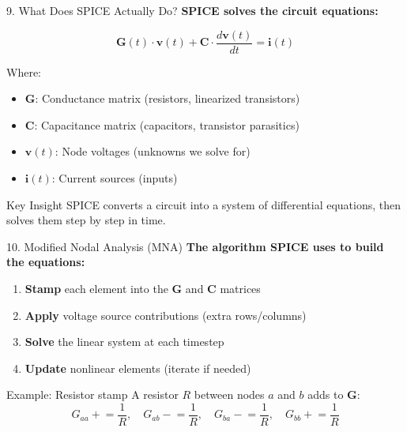 \documentclass[aspectratio=169, 11pt]{beamer}
\begin{document}
\begin{frame}{9. What Does SPICE Actually Do?}
    \textbf{SPICE solves the circuit equations:}

    \vspace{0.5em}
    \[ \mathbf{G}(t) \cdot \mathbf{v}(t) + \mathbf{C} \cdot \frac{d\mathbf{v}(t)}{dt} = \mathbf{i}(t) \]

    Where:
    \begin{itemize}
        \item $\mathbf{G}$: Conductance matrix (resistors, linearized transistors)
        \item $\mathbf{C}$: Capacitance matrix (capacitors, transistor parasitics)
        \item $\mathbf{v}(t)$: Node voltages (unknowns we solve for)
        \item $\mathbf{i}(t)$: Current sources (inputs)
    \end{itemize}

    \vspace{0.5em}
    \begin{block}{Key Insight}
        SPICE converts a circuit into a system of differential equations, then solves them step by step in time.
    \end{block}
\end{frame}

\begin{frame}{10. Modified Nodal Analysis (MNA)}
    \textbf{The algorithm SPICE uses to build the equations:}

    \vspace{0.5em}
    \begin{enumerate}
        \item \textbf{Stamp} each element into the $\mathbf{G}$ and $\mathbf{C}$ matrices
        \item \textbf{Apply} voltage source contributions (extra rows/columns)
        \item \textbf{Solve} the linear system at each timestep
        \item \textbf{Update} nonlinear elements (iterate if needed)
    \end{enumerate}

    \vspace{0.5em}
    \begin{block}{Example: Resistor stamp}
        A resistor $R$ between nodes $a$ and $b$ adds to $\mathbf{G}$:
        \[ G_{aa} \mathrel{+}= \frac{1}{R}, \quad G_{ab} \mathrel{-}= \frac{1}{R}, \quad G_{ba} \mathrel{-}= \frac{1}{R}, \quad G_{bb} \mathrel{+}= \frac{1}{R} \]
    \end{block}
\end{frame}
\end{document}
